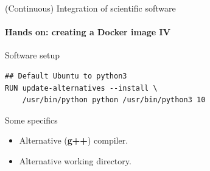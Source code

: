 \begin{frame}[fragile]{(Continuous) Integration of scientific software} 
    \framesubtitle{Hands on: creating a Docker image IV} 
    \vfill

    Software setup  

    \begin{verbatim}
## Default Ubuntu to python3
RUN update-alternatives --install \
    /usr/bin/python python /usr/bin/python3 10 
    \end{verbatim}

    \medskip

    Some specifics

    \begin{itemize}
        \item Alternative (\textbf{g++}) compiler. 
        \item Alternative working directory. 
    \end{itemize}

\end{frame}


